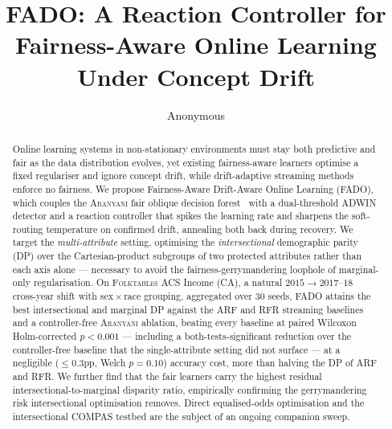 \documentclass[sigconf,anonymous,review]{acmart}
\title{FADO: A Reaction Controller for Fairness-Aware Online Learning Under Concept Drift}
\author{Anonymous}
\affiliation{%
  \institution{Anonymous}
  \country{}}
\begin{document}
\begin{abstract}
  Online learning systems in non-stationary environments must stay both predictive and fair as the data distribution evolves, yet existing fairness-aware learners
  optimise a fixed regulariser and ignore concept drift, while drift-adaptive streaming methods enforce no fairness. We propose Fairness-Aware Drift-Aware Online
  Learning (\textsc{FADO}), which couples the \textsc{Aranyani} fair oblique decision forest~\cite{chowdhury2024enhancing} with a dual-threshold ADWIN detector and a
  reaction controller that spikes the learning rate and sharpens the soft-routing temperature on confirmed drift, annealing both back during recovery. We target the
  \emph{multi-attribute} setting, optimising the \emph{intersectional} demographic parity (DP) over the Cartesian-product subgroups of two protected attributes rather
  than each axis alone --- necessary to avoid the fairness-gerrymandering loophole of marginal-only regularisation. On \textsc{Folktables} ACS Income (CA), a natural
  $2015\!\to\!2017$--$18$ cross-year shift with sex\,$\times$\,race grouping, aggregated over $30$ seeds, \textsc{FADO} attains the best intersectional and marginal DP
  against the \textsc{ARF} and \textsc{RFR} streaming baselines and a controller-free \textsc{Aranyani} ablation, beating every baseline at paired Wilcoxon Holm-corrected
  $p<0.001$ --- including a both-tests-significant reduction over the controller-free baseline that the single-attribute setting did not surface --- at a negligible
  ($\le\!0.3$pp, Welch $p=0.10$) accuracy cost, more than halving the DP of \textsc{ARF} and \textsc{RFR}. We further find that the fair learners carry the highest
  residual intersectional-to-marginal disparity ratio, empirically confirming the gerrymandering risk intersectional optimisation removes. Direct equalised-odds
  optimisation and the intersectional \textsc{COMPAS} testbed are the subject of an ongoing companion sweep.
\end{abstract}


\maketitle
\end{document}
